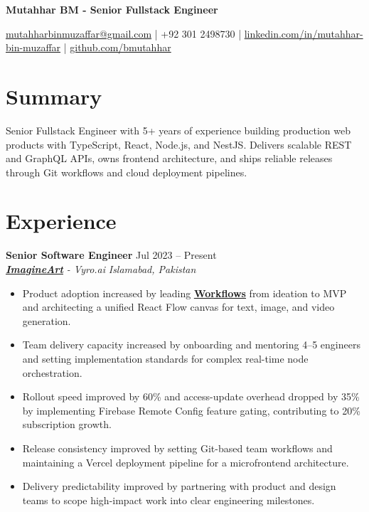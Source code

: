 \documentclass[9pt,letterpaper]{article}
\newcommand{\resumeHeader}[1]{%
  \begin{center}
    \vspace{2pt}
    {\fontsize{18pt}{20pt}\selectfont\bfseries #1\par}
    \vspace{4pt}
  \end{center}
}
\newcommand{\role}[4]{\textbf{#1} \hfill #2 \\
\textit{#3} \hfill \textit{#4}\\[-4pt]}
\begin{document}
\resumeHeader{Mutahhar BM - Senior Fullstack Engineer}
\begin{center}
\fontsize{9pt}{11pt}\selectfont
\href{mailto:mutahharbinmuzaffar@gmail.com}{mutahharbinmuzaffar@gmail.com} \;|\; +92 301 2498730 \;|\;
\href{https://www.linkedin.com/in/mutahhar-bin-muzaffar}{linkedin.com/in/mutahhar-bin-muzaffar} \;|\;
\href{https://github.com/bmutahhar}{github.com/bmutahhar}
\end{center}

\section*{Summary}
Senior Fullstack Engineer with 5+ years of experience building production web products with TypeScript, React, Node.js, and NestJS. Delivers scalable REST and GraphQL APIs, owns frontend architecture, and ships reliable releases through Git workflows and cloud deployment pipelines.

\section*{Experience}
\role{Senior Software Engineer}{Jul 2023 -- Present}{\href{https://www.imagine.art/}{\textbf{\underline{ImagineArt}}} - Vyro.ai}{Islamabad, Pakistan}
\begin{itemize}[leftmargin=*, itemsep=0pt, topsep=0pt, partopsep=0pt, parsep=0pt, after=\vspace{2pt}]
  \item Product adoption increased by leading \href{https://www.imagine.art/flow}{\textbf{\underline{Workflows}}} from ideation to MVP and architecting a unified React Flow canvas for text, image, and video generation.
  \item Team delivery capacity increased by onboarding and mentoring 4--5 engineers and setting implementation standards for complex real-time node orchestration.
  \item Rollout speed improved by 60\% and access-update overhead dropped by 35\% by implementing Firebase Remote Config feature gating, contributing to 20\% subscription growth.
  \item Release consistency improved by setting Git-based team workflows and maintaining a Vercel deployment pipeline for a microfrontend architecture.
  \item Delivery predictability improved by partnering with product and design teams to scope high-impact work into clear engineering milestones.
\end{itemize}
\end{document}
